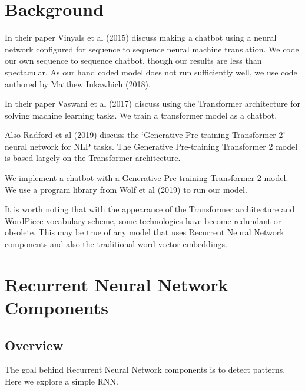 

\section{Background}

In their paper Vinyals et al (2015)\cite{DBLP:journals/corr/VinyalsL15} discuss making a chatbot using a neural network configured for sequence to sequence neural machine translation. We code our own sequence to sequence chatbot, though our results are less than spectacular. As our hand coded model does not run sufficiently well, we use code authored by Matthew Inkawhich (2018)\cite{2018Inkawhich}.

In their paper Vaswani et al (2017)\cite{Vaswani2017AttentionIA} discuss using the Transformer architecture for solving machine learning tasks. We train a transformer model as a chatbot.


Also Radford et al (2019)\cite{radford2019language} discuss the `Generative Pre-training Transformer 2' neural network for \ac{NLP} tasks. The Generative Pre-training Transformer 2 model is based largely on the Transformer architecture. 


We implement a chatbot with a Generative Pre-training Transformer 2 model. We use a program library from Wolf et al (2019)\cite{Wolf2019HuggingFacesTS} to run our model.


It is worth noting that with the appearance of the Transformer architecture and WordPiece vocabulary scheme, some technologies have become redundant or obsolete. This may be true of any model that uses Recurrent Neural Network components and also the traditional word vector embeddings.

\section{Recurrent Neural Network Components}

\subsection*{Overview}
The goal behind Recurrent Neural Network components is to detect patterns. Here we explore a simple \ac{RNN}.

